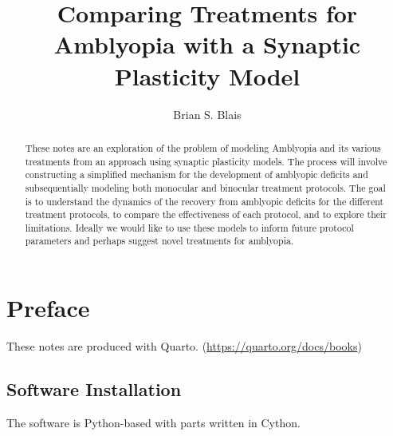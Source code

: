 \documentclass[
  letterpaper,
  number]{elsarticle}
\renewcommand*\contentsname{Table of contents}
\newcommand\contentsname{Table of contents}
\begin{document}
\begin{frontmatter}
\title{Comparing Treatments for Amblyopia with a Synaptic Plasticity
Model}
\author[]{Brian S. Blais%
%
}




        
\begin{abstract}
These notes are an exploration of the problem of modeling Amblyopia and
its various treatments from an approach using synaptic plasticity
models. The process will involve constructing a simplified mechanism for
the development of amblyopic deficits and subsequentially modeling both
monocular and binocular treatment protocols. The goal is to understand
the dynamics of the recovery from amblyopic deficits for the different
treatment protocols, to compare the effectiveness of each protocol, and
to explore their limitations. Ideally we would like to use these models
to inform future protocol parameters and perhaps suggest novel
treatments for amblyopia.
\end{abstract}





\end{frontmatter}\ifdefined\Shaded\renewenvironment{Shaded}{\begin{tcolorbox}[boxrule=0pt, interior hidden, borderline west={3pt}{0pt}{shadecolor}, enhanced, sharp corners, breakable, frame hidden]}{\end{tcolorbox}}\fi

\renewcommand*\contentsname{Table of contents}
{
\hypersetup{linkcolor=}
\setcounter{tocdepth}{2}
\tableofcontents
}

\hypertarget{preface}{%
\chapter*{Preface}\label{preface}}

These notes are produced with Quarto.
(\url{https://quarto.org/docs/books})

\hypertarget{software-installation}{%
\section*{Software Installation}\label{software-installation}}

The software is Python-based with parts written in Cython.
\end{document}
